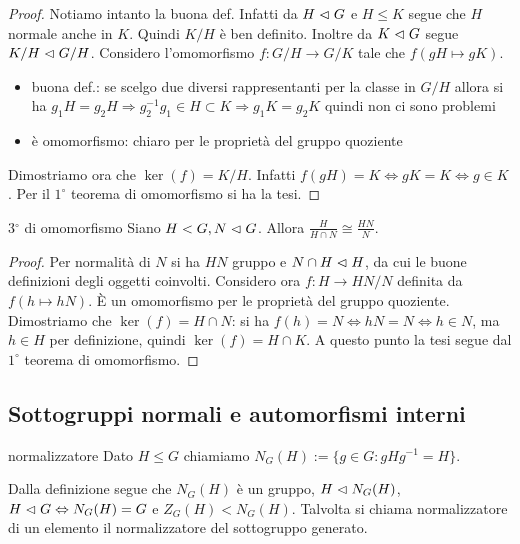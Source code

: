 \begin{proof}
    Notiamo intanto la buona def. Infatti da $H \vartriangleleft G$ e $H \leq K$ segue che $H$  normale anche in $K$. Quindi $K/H$ è ben definito. Inoltre da $K \vartriangleleft G$ segue $K/H \vartriangleleft G/H$.
    Considero l'omomorfismo $f: G/H \rightarrow G/K$ tale che $f(gH \mapsto gK)$.
    \begin{itemize}
    \item buona def.: se scelgo due diversi rappresentanti per la classe in $G/H$  allora si ha $g_1H = g_2H \Rightarrow g_2^{-1}g_1 \in H \subset K \Rightarrow g_1K = g_2K$ quindi non ci sono problemi
    \item è omomorfismo: chiaro per le proprietà del gruppo quoziente
    \end{itemize}
    Dimostriamo ora che $\ker(f) = K/H$. Infatti $f(gH) = K \iff gK = K \iff g \in K$. Per il $1^{\circ}$ teorema di omomorfismo si ha la tesi.
\end{proof}
\begin{theorem}{3$^{\circ}$ di omomorfismo} Siano $H < G, N \vartriangleleft G$. Allora $\frac{H}{H \cap N} \cong \frac{HN}{N}$.
\end{theorem}
\begin{proof}
    Per normalità di $N$ si ha $HN$ gruppo e $N \cap H \vartriangleleft H$, da cui le buone definizioni degli oggetti coinvolti. Considero ora $f: H \rightarrow HN/N$ definita da $f(h \mapsto hN)$. È un omomorfismo per le proprietà del gruppo quoziente. 
    Dimostriamo che $\ker(f) = H \cap N$: si ha $f(h) = N \iff hN = N \iff h \in N$, ma $h\in H$ per definizione, quindi $\ker(f) = H \cap K$. A questo punto la tesi segue dal $1^{\circ}$ teorema di omomorfismo.
\end{proof}

\subsection{Sottogruppi normali e automorfismi interni}
\begin{definition}{normalizzatore}
    Dato $H \leq G$ chiamiamo $N_G(H) := \{g \in G : gHg^{-1} = H\}$.
\end{definition}

Dalla definizione segue che $N_G(H)$ è un gruppo, $H \vartriangleleft N_G(H)$, $H \vartriangleleft G \Leftrightarrow N_G(H) = G$ e $Z_G(H) < N_G(H)$. Talvolta si chiama normalizzatore di un elemento il normalizzatore del sottogruppo generato.

